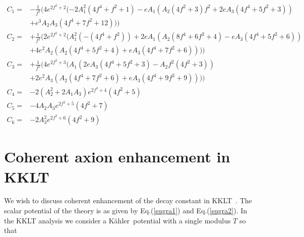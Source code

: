 \documentclass[12pt]{article}
\def\non{\nonumber\\}
\newcommand{\bl}[1]{{\color{blue}{#1}}}
\def\K{K\"ahler~}
\begin{document}
\begin{align}
C_1 = &- \frac{1}{f^2} (4  {e}^{2  {f}^{2} + 2}  ( - 2  {A}_{1}^{2}  \left( 4  {f}^{4} + {f}^{2} + 1 \right) - e  {A}_{1}  \left( {A}_{2}  \left( 4  {f}^{2} + 3 \right)  {f}^{2} + 2  e  {A}_{3}  \left( 4  {f}^{4} + 5  {f}^{2} + 3 \right) \right) \non
&+ {e}^{3}  {A}_{2}  {A}_{3}  \left( 4  {f}^{4} + 7  {f}^{2} + 12 \right) ))\non 
C_2=&+ \frac{1}{f^2}(2  {e}^{2  {f}^{2} + 2}  ( {A}_{1}^{2}  \left( - \left( 4  {f}^{4} + {f}^{2} \right) \right) + 2  e  {A}_{1}  \left( {A}_{2}  \left( 8  {f}^{4} + 6  {f}^{2} + 4 \right) - e  {A}_{3}  \left( 4  {f}^{4} + 5  {f}^{2} + 6 \right) \right) \non
&+ 4  {e}^{2}  {A}_{2}  \left( {A}_{2}  \left( 4  {f}^{4} + 5  {f}^{2} + 4 \right) + e  {A}_{3}  \left( 4  {f}^{4} + 7  {f}^{2} + 6 \right) \right) ))\non
C_3=&+ \frac{1}{f^2}(4  {e}^{2  {f}^{2} + 3}  ( {A}_{1}  \left( 2  e  {A}_{3}  \left( 4  {f}^{4} + 5  {f}^{2} + 3 \right) - {A}_{2}  {f}^{2}  \left( 4  {f}^{2} + 3 \right) \right) \non
& + 2  {e}^{2}  {A}_{3}  \left( {A}_{2}  \left( 4  {f}^{4} + 7  {f}^{2} + 6 \right) + e  {A}_{3}  \left( 4  {f}^{4} + 9  {f}^{2} + 9 \right) \right) ))\non
C_4=&- 2  \left( {A}_{2}^{2} + 2  {A}_{1}  {A}_{3} \right)  {e}^{2  {f}^{2} + 4}  \left( 4  {f}^{2} + 5 \right) \non
C_5=&- 4  {A}_{2}  {A}_{3}  {e}^{2  {f}^{2} + 5}  \left( 4  {f}^{2} + 7 \right) \non
C_6=&- 2  {A}_{3}^{2}  {e}^{2  {f}^{2} + 6}  \left( 4  {f}^{2} + 9 \right) 
\label{c1}
\end{align}
 \bl{Max: Simulation part needs to be added here.}


\section{Coherent axion enhancement in KKLT\label{sec5}}
 We wish to discuss coherent enhancement of the decay constant in KKLT~\cite{Kachru:2003aw}.
 The scalar potential of the theory is as given by Eq.(\ref{sugra1}) and Eq.(\ref{sugra2}).
In the KKLT analysis we consider a \K potential with a single modulus $T$ so that 
\end{document}
